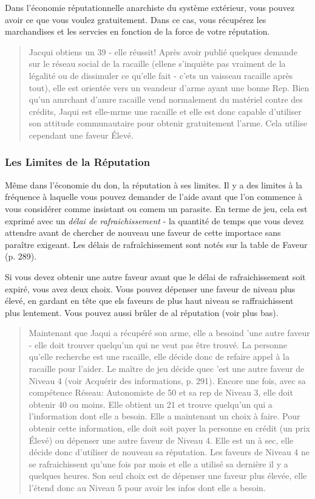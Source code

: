 Dans l'économie réputationnelle anarchiste du système extérieur, vous pouvez avoir ce que vous voulez gratuitement. Dans ce cas, vous récupérez les marchandises et les servcies en fonction de la force de votre réputation. 

\begin{quotation} Jacqui obtiens un 39 - elle réussit! Après avoir publié quelques demande sur le réseau social de la racaille (ellene s'inquiète pas vraiment de la légalité ou de dissimuler ce qu'elle fait - c'ets un vaisseau racaille après tout), elle est orientée vers un veandeur d'arme ayant une bonne Rep. Bien qu'un amrchant d'amre racaille vend normalement du matériel contre des crédits, Jaqui est elle-mrme une racaille et elle est donc capable d'utiliser son attitude communautaire pour obtenir gratuitement l'arme. Cela utilise cependant une faveur Élevé. \end{quotation} 



\subsubsection{Les Limites de la Réputation} 

Même dans l'économie du don, la réputation à ses limites. Il y a des limites à la fréquence à laquelle vous pouvez demander de l'aide avant que l'on commence à vous considérer comme insistant ou comem un parasite. En terme de jeu, cela est exprimé avec un \textit{délai de rafraichissement} - la quantité de temps que vous devez attendre avant de chercher de nouveau une faveur de cette importace sans paraître exigeant. Les délais de rafraîchissement sont notés sur la table de Faveur (p. 289). 

Si vous devez obtenir une autre faveur avant que le délai de rafraichissement soit expiré, vous avez deux choix. Vous pouvez dépenser une faveur de niveau plus élevé, en gardant en tête que els faveurs de plus haut niveau se raffraichissent plus lentement. Vous pouvez aussi brûler de al réputation (voir plus bas). 

\begin{quotation} Maintenant que Jaqui a récupéré son arme, elle a besoind 'une autre faveur - elle doit trouver quelqu'un qui ne veut pas être trouvé. La personne qu'elle recherche est une racaille, elle décide donc de refaire appel à la racaille pour l'aider. Le maître de jeu décide quec 'est une autre faveur de Niveau 4 (voir Acquérir des informations, p. 291). Encore une fois, avec sa compétence Réseau: Autonomiste de 50 et sa rep de Niveau 3, elle doit obtenir 40 ou moins. Elle obtient un 21 et trouve quelqu'un qui a l'information dont elle a besoin. Elle a maintenant un choix à faire. Pour obtenir cette information, elle doit soit payer la personne en crédit (un prix Élevé) ou dépenser une autre faveur de Niveau 4. Elle est un à sec, elle décide donc d'utiliser de nouveau sa réputation. Les faveurs de Niveau 4 ne se rafraichissent qu'une fois par mois et elle a utilisé sa dernière il y a quelques heures. Son seul choix est de dépenser une faveur plus élevée, elle l'étend donc au Niveau 5 pour avoir les infos dont elle a besoin. \end{quotation} 



